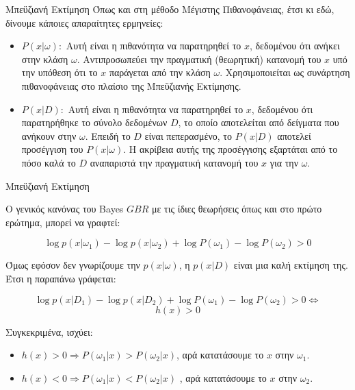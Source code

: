 \documentclass{beamer}
\newcommand{\gr}{\selectlanguage{greek}}
\newcommand{\en}{\selectlanguage{english}}
\begin{document}
\begin{frame}{Μπεϋζιανή Εκτίμηση}
    Όπως και στη μέθοδο Μέγιστης Πιθανοφάνειας, έτσι κι εδώ, δίνουμε κάποιες απαραίτητες ερμηνείες:
    \begin{itemize}
        \item $P(x|\omega):$ Αυτή είναι η πιθανότητα να παρατηρηθεί το $x$, δεδομένου ότι ανήκει στην κλάση $\omega$. Αντιπροσωπεύει την πραγματική (θεωρητική) κατανομή του $x$ υπό την υπόθεση ότι το $x$ παράγεται από την κλάση $\omega$. Χρησιμοποιείται ως συνάρτηση πιθανοφάνειας στο πλαίσιο της Μπεϋζιανής Εκτίμησης.
        \item $P(x|D):$ Αυτή είναι η πιθανότητα να παρατηρηθεί το $x$, δεδομένου ότι παρατηρήθηκε το σύνολο δεδομένων $D$, το οποίο αποτελείται από δείγματα που ανήκουν στην $\omega$. Επειδή το $D$ είναι πεπερασμένο, το $P(x|D)$ αποτελεί προσέγγιση του $P(x|\omega)$. Η ακρίβεια αυτής της προσέγγισης εξαρτάται από το πόσο καλά το $D$ αναπαριστά την πραγματική κατανομή του $x$ για την $\omega$.

    \end{itemize}
\end{frame} 


\begin{frame}{Μπεϋζιανή Εκτίμηση}

    O γενικός κανόνας του \en Bayes $GBR$ \gr με τις ίδιες θεωρήσεις όπως και στο πρώτο ερώτημα, μπορεί να γραφτεί:

    \begin{equation}
        \log p(x|\omega_1) - \log p(x|\omega_2) + \log P(\omega_1) - \log P(\omega_2) > 0
    \end{equation}

    Όμως εφόσον δεν γνωρίζουμε την $p(x|\omega)$, η $p(x|D)$ είναι μια καλή εκτίμηση της. Έτσι η παραπάνω γράφεται:

    \begin{equation}
        \log p(x|D_1) - \log p(x|D_2) + \log P(\omega_1) - \log P(\omega_2) >0 \Leftrightarrow 
    \end{equation}
    \[ h(x) > 0\]

    Συγκεκριμένα, ισχύει:

    \begin{itemize}
        \item  $h(x) > 0 \Rightarrow P(\omega_1|x) > P(\omega_2|x)$, αρά κατατάσουμε το $x$ στην $\omega_1$.
        \item $h(x) < 0 \Rightarrow P(\omega_1|x) <  P(\omega_2|x)$ , αρά κατατάσουμε το $x$ στην $\omega_2$.
    \end{itemize}

    
    
\end{frame}
\end{document}
